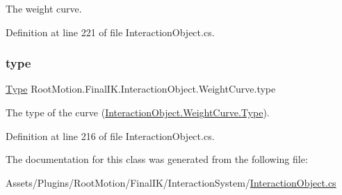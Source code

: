 The weight curve. 



Definition at line 221 of file Interaction\+Object.\+cs.

\mbox{\label{class_root_motion_1_1_final_i_k_1_1_interaction_object_1_1_weight_curve_ad9e0fc4c086fd89f5d00c360499258fb}} 
\subsubsection{\texorpdfstring{type}{type}}
{\footnotesize\ttfamily \mbox{\hyperlink{class_root_motion_1_1_final_i_k_1_1_interaction_object_1_1_weight_curve_a74c8be2e80ace86b130c88e275300b27}{Type}} Root\+Motion.\+Final\+I\+K.\+Interaction\+Object.\+Weight\+Curve.\+type}



The type of the curve (\mbox{\hyperlink{class_root_motion_1_1_final_i_k_1_1_interaction_object_1_1_weight_curve_a74c8be2e80ace86b130c88e275300b27}{Interaction\+Object.\+Weight\+Curve.\+Type}}). 



Definition at line 216 of file Interaction\+Object.\+cs.



The documentation for this class was generated from the following file\+:\begin{DoxyCompactItemize}
\item 
Assets/\+Plugins/\+Root\+Motion/\+Final\+I\+K/\+Interaction\+System/\mbox{\hyperlink{_interaction_object_8cs}{Interaction\+Object.\+cs}}\end{DoxyCompactItemize}
